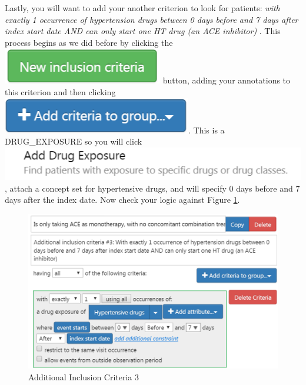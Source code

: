 \documentclass[11pt]{book}
\theoremstyle{definition}
\theoremstyle{definition}
\theoremstyle{definition}
\theoremstyle{remark}
\begin{document}
Lastly, you will want to add your another criterion to look for patients: \emph{with exactly 1 occurrence of hypertension drugs between 0 days before and 7 days after index start date AND can only start one HT drug (an ACE inhibitor)} . This process begins as we did before by clicking the \includegraphics{images/Cohorts/newinclusion.png} button, adding your annotations to this criterion and then clicking \includegraphics{images/Cohorts/additionalcriteria.png}. This is a DRUG\_EXPOSURE so you will click \includegraphics{images/Cohorts/add-drugexposure.png}, attach a concept set for hypertensive drugs, and will specify 0 days before and 7 days after the index date. Now check your logic against Figure \ref{fig:ATLASIC3}.

\begin{figure}

{\centering \includegraphics[width=0.9\linewidth]{images/Cohorts/ATLAS-IC3} 

}

\caption{Additional Inclusion Criteria 3}\label{fig:ATLASIC3}
\end{figure}
\end{document}
